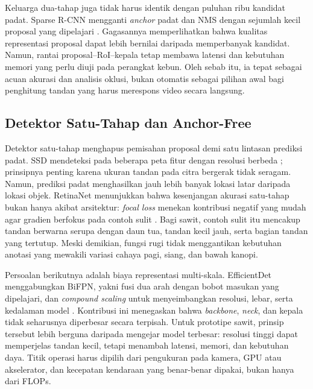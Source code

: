 Keluarga dua-tahap juga tidak harus identik dengan puluhan ribu kandidat padat. Sparse R-CNN mengganti \textit{anchor} padat dan NMS dengan sejumlah kecil proposal yang dipelajari \cite{sun2021sparsercnn}. Gagasannya memperlihatkan bahwa kualitas representasi proposal dapat lebih bernilai daripada memperbanyak kandidat. Namun, rantai proposal--RoI--kepala tetap membawa latensi dan kebutuhan memori yang perlu diuji pada perangkat kebun. Oleh sebab itu, ia tepat sebagai acuan akurasi dan analisis oklusi, bukan otomatis sebagai pilihan awal bagi penghitung tandan yang harus merespons video secara langsung.

\subsection{Detektor Satu-Tahap dan Anchor-Free}
Detektor satu-tahap menghapus pemisahan proposal demi satu lintasan prediksi padat. SSD mendeteksi pada beberapa peta fitur dengan resolusi berbeda \cite{liu2016ssd}; prinsipnya penting karena ukuran tandan pada citra bergerak tidak seragam. Namun, prediksi padat menghasilkan jauh lebih banyak lokasi latar daripada lokasi objek. RetinaNet menunjukkan bahwa kesenjangan akurasi satu-tahap bukan hanya akibat arsitektur: \textit{focal loss} menekan kontribusi negatif yang mudah agar gradien berfokus pada contoh sulit \cite{lin2017focal}. Bagi sawit, contoh sulit itu mencakup tandan berwarna serupa dengan daun tua, tandan kecil jauh, serta bagian tandan yang tertutup. Meski demikian, fungsi rugi tidak menggantikan kebutuhan anotasi yang mewakili variasi cahaya pagi, siang, dan bawah kanopi.

Persoalan berikutnya adalah biaya representasi multi-skala. EfficientDet menggabungkan BiFPN, yakni fusi dua arah dengan bobot masukan yang dipelajari, dan \textit{compound scaling} untuk menyeimbangkan resolusi, lebar, serta kedalaman model \cite{tan2020efficientdet}. Kontribusi ini menegaskan bahwa \textit{backbone}, \textit{neck}, dan kepala tidak seharusnya diperbesar secara terpisah. Untuk prototipe sawit, prinsip tersebut lebih berguna daripada mengejar model terbesar: resolusi tinggi dapat memperjelas tandan kecil, tetapi menambah latensi, memori, dan kebutuhan daya. Titik operasi harus dipilih dari pengukuran pada kamera, GPU atau akselerator, dan kecepatan kendaraan yang benar-benar dipakai, bukan hanya dari FLOPs.

